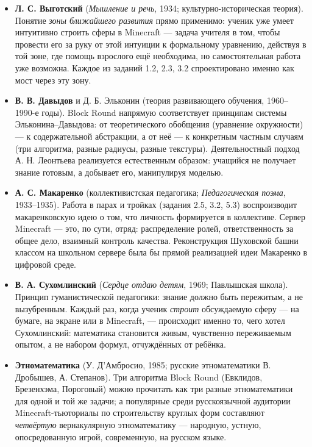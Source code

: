 \documentclass[12pt,a4paper]{scrartcl}
\newcommand{\acc}[1]{\textcolor{accent}{\textbf{#1}}}
\begin{document}
\begin{itemize}[leftmargin=1.3em,itemsep=0.2em,topsep=0.3em]
  \item \acc{Л. С. Выготский} (\emph{Мышление и речь}, 1934; культурно-историческая теория). Понятие \emph{зоны ближайшего развития} прямо применимо: ученик уже умеет интуитивно строить сферы в Minecraft --- задача учителя в том, чтобы провести его за руку от этой интуиции к формальному уравнению, действуя в той зоне, где помощь взрослого ещё необходима, но самостоятельная работа уже возможна. Каждое из заданий 1.2, 2.3, 3.2 спроектировано именно как мост через эту зону.

  \item \acc{В. В. Давыдов} и Д. Б. Эльконин (теория развивающего обучения, 1960--1990-е годы). Block Round напрямую соответствует принципам системы Эльконина--Давыдова: от теоретического обобщения (уравнение окружности) --- к содержательной абстракции, а от неё --- к конкретным частным случаям (три алгоритма, разные радиусы, разные текстуры). Деятельностный подход А. Н. Леонтьева реализуется естественным образом: учащийся не получает знание готовым, а добывает его, манипулируя моделью.

  \item \acc{А. С. Макаренко} (коллективистская педагогика; \emph{Педагогическая поэма}, 1933--1935). Работа в парах и тройках (задания 2.5, 3.2, 5.3) воспроизводит макаренковскую идею о том, что личность формируется в коллективе. Сервер Minecraft --- это, по сути, отряд: распределение ролей, ответственность за общее дело, взаимный контроль качества. Реконструкция Шуховской башни классом на школьном сервере была бы прямой реализацией идеи Макаренко в цифровой среде.

  \item \acc{В. А. Сухомлинский} (\emph{Сердце отдаю детям}, 1969; Павлышская школа). Принцип гуманистической педагогики: знание должно быть пережитым, а не вызубренным. Каждый раз, когда ученик \emph{строит} обсуждаемую сферу --- на бумаге, на экране или в Minecraft, --- происходит именно то, чего хотел Сухомлинский: математика становится живым, чувственно переживаемым опытом, а не набором формул, отчуждённых от ребёнка.

  \item \acc{Этноматематика} (У. Д'Амбросио, 1985; русские этноматематики В. Дробышев, А. Степанов). Три алгоритма Block Round (Евклидов, Брезенхэма, Пороговый) можно прочитать как три разные этноматематики для одной и той же задачи; а популярные среди русскоязычной аудитории Minecraft-тьюториалы по строительству круглых форм составляют \emph{четвёртую} вернакулярную этноматематику --- народную, устную, опосредованную игрой, современную, на русском языке.
\end{itemize}
\end{document}
